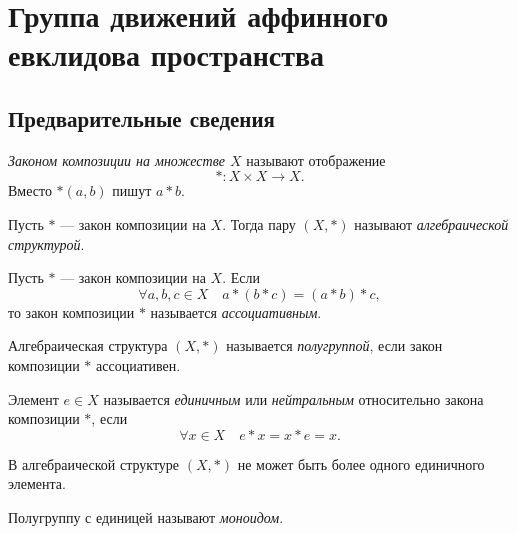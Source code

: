\section{Группа движений аффинного евклидова пространства}

\subsection{Предварительные сведения}

\begin{definition}
  \textit{Законом композиции на множестве $X$} называют отображение
  \begin{equation*}
    * : X \times X \to X.
  \end{equation*}
  Вместо $*(a,b)$ пишут $a * b$.
\end{definition}

\begin{definition}
  Пусть $*$ --- закон композиции на $X$. Тогда пару $(X, *)$ называют
  \textit{алгебраической структурой}.
\end{definition}

\begin{definition}
  Пусть $*$ --- закон композиции на $X$. Если
  \begin{equation*}
    \forall a,b,c \in X \quad a * (b * c) = (a * b) * c,
  \end{equation*}
  то закон композиции $*$ называется \textit{ассоциативным}.
\end{definition}

\begin{definition}
  Алгебраическая структура $(X, *)$ называется \textit{полугруппой}, если закон
  композиции $*$ ассоциативен.
\end{definition}

\begin{definition}
  Элемент $e \in X$ называется \textit{единичным} или \textit{нейтральным}
  относительно закона композиции $*$, если
  \begin{equation*}
    \forall x \in X \quad e * x = x * e = x.
  \end{equation*}
\end{definition}

\begin{remark}
  В алгебраической структуре $(X, *)$ не может быть более одного единичного
  элемента.
\end{remark}

\begin{definition}
  Полугруппу с единицей называют \textit{моноидом}.
\end{definition}

